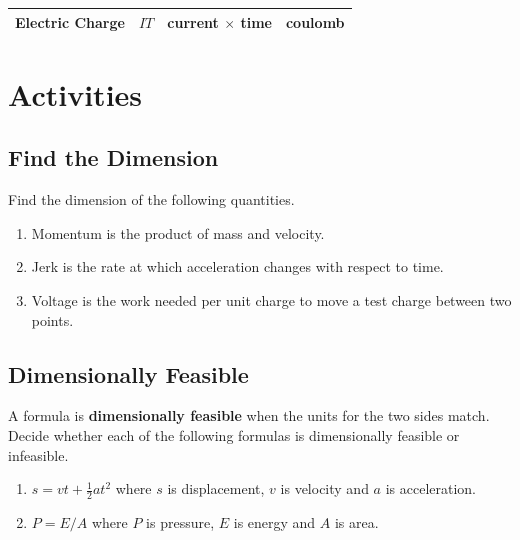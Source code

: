 \documentclass[
]{book}
\providecommand{\tightlist}{%
  \setlength{\itemsep}{0pt}\setlength{\parskip}{0pt}}
\begin{document}
\begin{longtable}[]{@{}llll@{}}
\begin{minipage}[t]{0.21\columnwidth}
Electric Charge\strut
\end{minipage} & \begin{minipage}[t]{0.17\columnwidth}\raggedright
\(I T\)\strut
\end{minipage} & \begin{minipage}[t]{0.23\columnwidth}\raggedright
current \(\times\) time\strut
\end{minipage} & \begin{minipage}[t]{0.28\columnwidth}\raggedright
coulomb\strut
\end{minipage}\tabularnewline
\bottomrule
\end{longtable}

\hypertarget{activities-7}{%
\section{Activities}\label{activities-7}}

\hypertarget{find-the-dimension}{%
\subsection{Find the Dimension}\label{find-the-dimension}}

Find the dimension of the following quantities.

\begin{enumerate}
\def\labelenumi{\arabic{enumi}.}
\tightlist
\item
  Momentum is the product of mass and velocity.
\item
  Jerk is the rate at which acceleration changes with respect to time.
\item
  Voltage is the work needed per unit charge to move a test charge between two points.
\end{enumerate}

\hypertarget{dimensionally-feasible}{%
\subsection{Dimensionally Feasible}\label{dimensionally-feasible}}

A formula is \textbf{dimensionally feasible} when the units for the two sides match.
Decide whether each of the following formulas is dimensionally feasible or infeasible.

\begin{enumerate}
\def\labelenumi{\arabic{enumi}.}
\tightlist
\item
  \(s = vt + \frac{1}{2}at^2\) where \(s\) is displacement, \(v\) is velocity and \(a\) is acceleration.
\item
  \(P = E/A\) where \(P\) is pressure, \(E\) is energy and \(A\) is area.
\end{enumerate}
\end{document}
